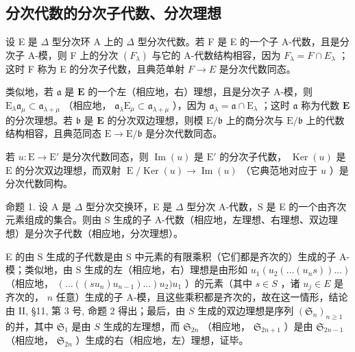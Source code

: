 \subsection{分次代数的分次子代数、分次理想}

设 E 是 \(\Delta\) 型分次环 A 上的 \(\Delta\) 型分次代数。若 F 是 E 的一个子 A-代数，且是分次子 A-模，则 F 上的分次 \((F_{\lambda})\) 与它的 A-代数结构相容，因为 \(F_{\lambda} = F \cap E_{\lambda}\) ；这时 F 称为 E 的分次子代数，且典范单射 \(F \to E\) 是分次代数同态。

类似地，若 \(\mathfrak{a}\) 是 \(\mathbf{E}\) 的一个左（相应地，右）理想，且是分次子 A-模，则 \(\mathrm{E}_{\lambda}\mathfrak{a}_{\mu} \subset \mathfrak{a}_{\lambda + \mu}\) （相应地， \(\mathfrak{a}_{\lambda}\mathrm{E}_{\mu} \subset \mathfrak{a}_{\lambda + \mu}\) ），因为 \(\mathfrak{a}_{\lambda} = \mathfrak{a} \cap \mathrm{E}_{\lambda}\) ；这时 \(\mathfrak{a}\) 称为代数 \(\mathbf{E}\) 的分次理想。若 \(\mathfrak{b}\) 是 \(\mathbf{E}\) 的分次双边理想，则模 \(\mathrm{E} / \mathfrak{b}\) 上的商分次与 \(\mathrm{E} / \mathfrak{b}\) 上的代数结构相容，且典范同态 \(\mathrm{E} \to \mathrm{E} / \mathfrak{b}\) 是分次代数同态。

若 \(u: \mathrm{E} \to \mathrm{E}'\) 是分次代数同态，则 \(\operatorname{Im}(u)\) 是 \(\mathrm{E}'\) 的分次子代数， \(\operatorname{Ker}(u)\) 是 \(\mathrm{E}\) 的分次双边理想，而双射 \(\operatorname{E} / \operatorname{Ker}(u) \to \operatorname{Im}(u)\) （它典范地对应于 \(u\) ）是分次代数同构。

命题 1. 设 A 是 \(\Delta\) 型分次交换环，E 是 \(\Delta\) 型分次 A-代数，S 是 E 的一个由齐次元素组成的集合。则由 S 生成的子 A-代数（相应地，左理想、右理想、双边理想）是分次子代数（相应地，分次理想）。

E 的由 S 生成的子代数是由 S 中元素的有限乘积（它们都是齐次的）生成的子 A-模；类似地，由 S 生成的左（相应地，右）理想是由形如 \(u_{1}(u_{2}(\ldots(u_{n}s))\ldots)\) （相应地， \((\ldots((su_{n})u_{n-1})\ldots)u_{2})u_{1}\) ）的元素（其中 \(s \in S\) ，诸 \(u_{j} \in E\) 是齐次的， \(n\) 任意）生成的子 A-模，且这些乘积都是齐次的，故在这一情形，结论由 II, §11, 第 3 号, 命题 2 得出；最后，由 \(S\) 生成的双边理想是序列 \((\mathfrak{S}_{n})_{n \geqslant 1}\) 的并，其中 \(\mathfrak{S}_{1}\) 是由 \(S\) 生成的左理想，而 \(\mathfrak{S}_{2n}\) （相应地， \(\mathfrak{S}_{2n+1}\) ）是由 \(\mathfrak{S}_{2n-1}\) （相应地， \(\mathfrak{S}_{2n}\) ）生成的右（相应地，左）理想，证毕。

